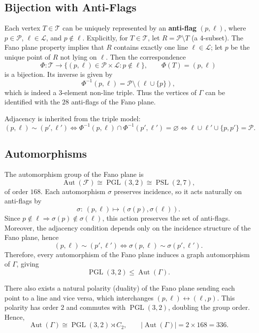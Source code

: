 \documentclass[12pt,a4paper,openany]{book}
\begin{document}
\subsection*{Bijection with Anti-Flags}
Each vertex $T\in\mathcal{T}$ can be uniquely represented by an \textbf{anti-flag} $(p,\ell)$, where $p\in\mathcal{P}$, $\ell\in\mathcal{L}$, and $p\notin\ell$.  
Explicitly, for $T\in\mathcal{T}$, let $R=\mathcal{P}\setminus T$ (a $4$-subset).  
The Fano plane property implies that $R$ contains exactly one line $\ell\in\mathcal{L}$; let $p$ be the unique point of $R$ not lying on $\ell$.  
Then the correspondence
\[
\Phi : \mathcal{T} \longrightarrow \{(p,\ell)\in\mathcal{P}\times\mathcal{L} : p\notin\ell\}, 
\qquad \Phi(T) = (p,\ell)
\]
is a bijection.  
Its inverse is given by
\[
\Phi^{-1}(p,\ell) = \mathcal{P}\setminus(\ell\cup\{p\}),
\]
which is indeed a $3$-element non-line triple.  
Thus the vertices of $\Gamma$ can be identified with the $28$ anti-flags of the Fano plane.

Adjacency is inherited from the triple model:
\[
(p,\ell)\sim(p',\ell') \iff 
\Phi^{-1}(p,\ell)\cap \Phi^{-1}(p',\ell')=\varnothing
\iff 
\ell\cup\ell'\cup\{p,p'\}=\mathcal{P}.
\]

\subsection*{Automorphisms}
The automorphism group of the Fano plane is
\[
\operatorname{Aut}(\mathcal{F}) \cong \operatorname{PGL}(3,2) \cong \operatorname{PSL}(2,7),
\]
of order $168$.  
Each automorphism $\sigma$ preserves incidence, so it acts naturally on anti-flags by
\[
\sigma\!:\ (p,\ell) \longmapsto (\sigma(p),\sigma(\ell)).
\]
Since $p\notin\ell \Rightarrow \sigma(p)\notin\sigma(\ell)$, this action preserves the set of anti-flags.  
Moreover, the adjacency condition depends only on the incidence structure of the Fano plane, hence
\[
(p,\ell)\sim(p',\ell') 
\iff 
\sigma(p,\ell)\sim\sigma(p',\ell').
\]
Therefore, every automorphism of the Fano plane induces a graph automorphism of $\Gamma$, giving
\[
\operatorname{PGL}(3,2)\leq\operatorname{Aut}(\Gamma).
\]

There also exists a natural polarity (duality) of the Fano plane sending each point to a line and vice versa, which interchanges $(p,\ell)\leftrightarrow(\ell,p)$.
This polarity has order $2$ and commutes with $\operatorname{PGL}(3,2)$, doubling the group order.  
Hence,
\[
\operatorname{Aut}(\Gamma)\cong \operatorname{PGL}(3,2)\rtimes C_2, 
\qquad |\operatorname{Aut}(\Gamma)| = 2\times 168 = 336.
\]
\end{document}
